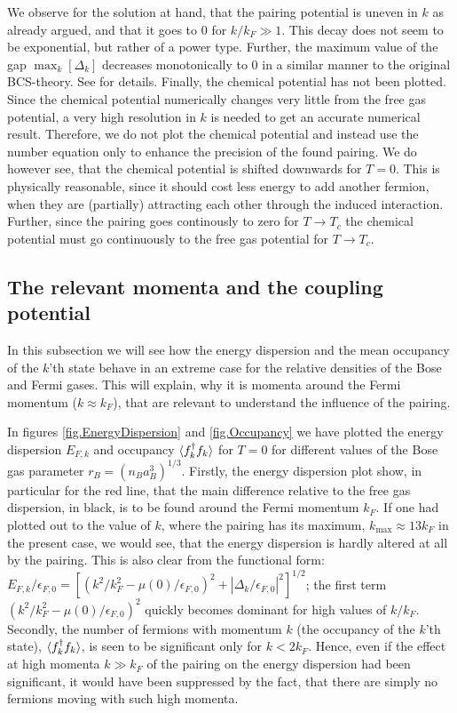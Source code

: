 We observe for the solution at hand, that the pairing potential is uneven in $k$ as already argued, and that it goes to 0 for $k/k_F \gg 1$. This decay does not seem to be exponential, but rather of a power type. Further, the maximum value of the gap $\max_k[\Delta_k]$ decreases monotonically to 0 in a similar manner to the original BCS-theory. See \cite{Tinkham,BruusFlensberg,PlischkeStatPhys} for details. Finally, the chemical potential has not been plotted. Since the chemical potential numerically changes very little from the free gas potential, a very high resolution in $k$ is needed to get an accurate numerical result. Therefore, we do not plot the chemical potential and instead use the number equation only to enhance the precision of the found pairing. We do however see, that the chemical potential is shifted downwards for $T = 0$. This is physically reasonable, since it should cost less energy to add another fermion, when they are (partially) attracting each other through the induced interaction. Further, since the pairing goes continously to zero for $T\to T_c$ the chemical potential must go continuously to the free gas potential for $T\to T_c$. 


\subsection{The relevant momenta and the coupling potential}
In this subsection we will see how the energy dispersion and the mean occupancy of the $k$'th state behave in an extreme case for the relative densities of the Bose and Fermi gases. This will explain, why it is momenta around the Fermi momentum ($k \approx k_F$), that are relevant to understand the influence of the pairing. 

In figures \ref{fig.EnergyDispersion} and \ref{fig.Occupancy} we have plotted the energy dispersion $E_{F,k}$ and occupancy $\braket{f_k^\dagger f_k}$ for $T = 0$ for different values of the Bose gas parameter $r_B = (n_Ba_B^3)^{1/3}$. Firstly, the energy dispersion plot show, in particular for the red line, that the main difference relative to the free gas dispersion, in black, is to be found around the Fermi momentum $k_F$. If one had plotted out to the value of $k$, where the pairing has its maximum, $k_{\max} \approx 13 k_F$ in the present case, we would see, that the energy dispersion is hardly altered at all by the pairing. This is also clear from the functional form: $E_{F,k}/\epsilon_{F,0} = [(k^2/k_F^2 - \mu(0)/\epsilon_{F,0})^2 + |\Delta_k/\epsilon_{F,0}|^2 ]^{1/2}$; the first term $(k^2/k_F^2 - \mu(0)/\epsilon_{F,0})^2$ quickly becomes dominant for high values of $k/k_F$. Secondly, the number of fermions with momentum $k$ (the occupancy of the $k$'th state), $\braket{f_k^\dagger f_k}$, is seen to be significant only for $k < 2k_F$. Hence, even if the effect at high momenta $k \gg k_F$ of the pairing on the energy dispersion had been significant, it would have been suppressed by the fact, that there are simply no fermions moving with such high momenta.

